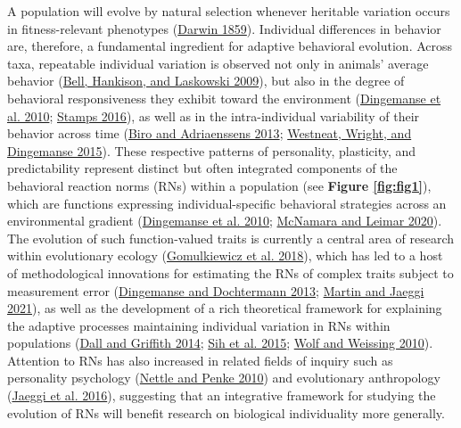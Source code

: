 \documentclass{article}
\begin{document}
A population will evolve by natural selection whenever heritable
variation occurs in fitness-relevant phenotypes
(\protect\hyperlink{ref-Darwin}{Darwin 1859}). Individual differences in
behavior are, therefore, a fundamental ingredient for adaptive
behavioral evolution. Across taxa, repeatable individual variation is
observed not only in animals' average behavior
(\protect\hyperlink{ref-Bell2009}{Bell, Hankison, and Laskowski 2009}),
but also in the degree of behavioral responsiveness they exhibit toward
the environment (\protect\hyperlink{ref-Ding2010}{Dingemanse et al.
2010}; \protect\hyperlink{ref-Stamps2016}{Stamps 2016}), as well as in
the intra-individual variability of their behavior across time
(\protect\hyperlink{ref-Biro2013}{Biro and Adriaenssens 2013};
\protect\hyperlink{ref-Westneat2015}{Westneat, Wright, and Dingemanse
2015}). These respective patterns of personality, plasticity, and
predictability represent distinct but often integrated components of the
behavioral reaction norms (RNs) within a population (see \textbf{Figure
\ref{fig:fig1}}), which are functions expressing individual-specific
behavioral strategies across an environmental gradient
(\protect\hyperlink{ref-Ding2010}{Dingemanse et al. 2010};
\protect\hyperlink{ref-McNamara2020}{McNamara and Leimar 2020}). The
evolution of such function-valued traits is currently a central area of
research within evolutionary ecology
(\protect\hyperlink{ref-Gomulk2018}{Gomulkiewicz et al. 2018}), which
has led to a host of methodological innovations for estimating the RNs
of complex traits subject to measurement error
(\protect\hyperlink{ref-DingDocht2013}{Dingemanse and Dochtermann 2013};
\protect\hyperlink{ref-Martin2021}{Martin and Jaeggi 2021}), as well as
the development of a rich theoretical framework for explaining the
adaptive processes maintaining individual variation in RNs within
populations (\protect\hyperlink{ref-Dall2014}{Dall and Griffith 2014};
\protect\hyperlink{ref-Sih2015}{Sih et al. 2015};
\protect\hyperlink{ref-Wolf2010}{Wolf and Weissing 2010}). Attention to
RNs has also increased in related fields of inquiry such as personality
psychology (\protect\hyperlink{ref-Nettle2010}{Nettle and Penke 2010})
and evolutionary anthropology (\protect\hyperlink{ref-Jaeggi2016}{Jaeggi
et al. 2016}), suggesting that an integrative framework for studying the
evolution of RNs will benefit research on biological individuality more
generally.
\end{document}
